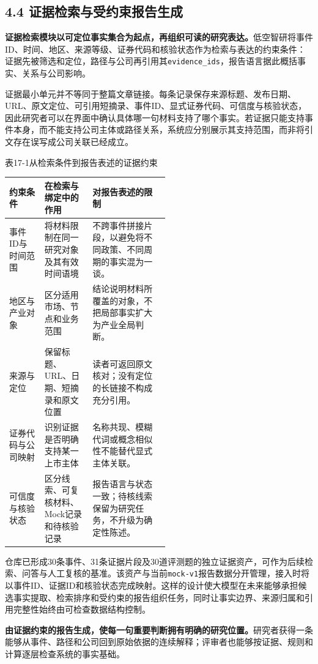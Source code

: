 \subsection*{4.4 证据检索与受约束报告生成}\label{page:17}
\noindent\textbf{证据检索模块以可定位事实集合为起点，再组织可读的研究表达。}低空智研将事件ID、时间、地区、来源等级、证券代码和核验状态作为检索与表达的约束条件：证据先被筛选和定位，路径与公司再引用其\texttt{evidence\_ids}，报告语言据此概括事实、关系与公司影响\cite{lhy-evidence,lhy-contracts}。

证据最小单元并不等同于整篇文章链接。每条记录保存来源标题、发布日期、URL、原文定位、可引用短摘录、事件ID、显式证券代码、可信度与核验状态，因此研究者可以在界面中确认具体哪一句材料支持了哪个事实。若证据只能支持事件本身，而不能支持公司主体或路径关系，系统应分别展示其支持范围，而非将引文存在误写成公司关联已经成立。

\begin{center}\small 表17-1\quad 从检索条件到报告表述的证据约束\par\vspace{1mm}
\begin{tabularx}{\linewidth}{p{0.22\linewidth}p{0.30\linewidth}X}
\toprule
约束条件 & 在检索与绑定中的作用 & 对报告表述的限制\\
\midrule
事件ID与时间范围 & 将材料限制在同一研究对象及其有效时间语境 & 不跨事件拼接片段，以避免将不同政策、不同周期的事实混为一谈。\\
地区与产业对象 & 区分适用市场、节点和业务范围 & 结论说明材料所覆盖的对象，不把局部事实扩大为产业全局判断。\\
来源与定位 & 保留标题、URL、日期、短摘录和原文位置 & 读者可返回原文核对；没有定位的长链接不构成充分引用。\\
证券代码与公司映射 & 识别证据是否明确支持某一上市主体 & 名称共现、模糊代词或概念相似性不能替代显式主体关联。\\
可信度与核验状态 & 区分线索、可复核材料、Mock记录和待核验记录 & 报告语言与状态一致；待核线索保留为研究任务，不升级为确定性陈述。\\
\bottomrule
\end{tabularx}\end{center}

仓库已形成30条事件、31条证据片段及30道评测题的独立证据资产，可作为后续检索、问答与人工复核的基准\cite{lhy-evidence}。该资产与当前\texttt{mock-v1}报告数据分开管理，接入时将以事件ID、证据ID和核验状态完成映射。这样的设计使大模型在未来能够承担候选事实提取、检索排序和受约束的报告组织任务，同时让事实边界、来源归属和引用完整性始终由可检查数据结构控制。

\noindent\textbf{由证据约束的报告生成，使每一句重要判断拥有明确的研究位置。}研究者获得一条能够从事件、路径和公司回到原始依据的连续解释；评审者也能够按证据、规则和计算逐层检查系统的事实基础。
